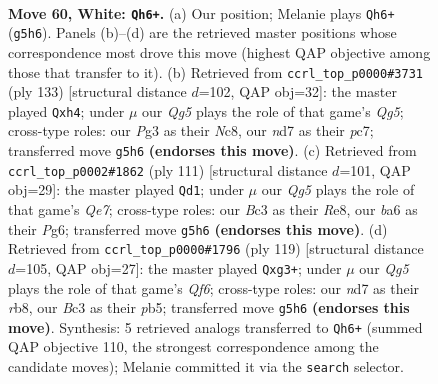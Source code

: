 \documentclass[11pt]{article}
\begin{document}
\clearpage

\begin{figure}[p]\centering
\begin{subfigure}{0.46\textwidth}\centering
\resizebox{\linewidth}{!}{%
\newchessgame
\chessboard[
  setfen={3q3k/3n1p2/b2P1n2/6Q1/2p4P/p1B2pP1/P7/1R4K1 w - - 0 60},
  showmover=false,
  pgfstyle=straightmove, color=movearrow, markmove={g5-h6}
]}
\caption{}
\end{subfigure}\hfill
\begin{subfigure}{0.46\textwidth}\centering
\resizebox{\linewidth}{!}{%
\newchessgame
\chessboard[
  setfen={2n2k2/p1P2p2/P7/4p2p/2Q1N1qP/3K4/8/8 b - - 5 67},
  showmover=false,
  pgfstyle=straightmove, color=movearrow, markmove={g4-h4}
]}
\caption{}
\end{subfigure}
\\[4pt]
\begin{subfigure}{0.46\textwidth}\centering
\resizebox{\linewidth}{!}{%
\newchessgame
\chessboard[
  setfen={4r1k1/5p2/6pp/1pPP4/6P1/1NQ1p2P/KR2q3/8 b - - 1 56},
  showmover=false,
  pgfstyle=straightmove, color=movearrow, markmove={e2-d1}
]}
\caption{}
\end{subfigure}\hfill
\begin{subfigure}{0.46\textwidth}\centering
\resizebox{\linewidth}{!}{%
\newchessgame
\chessboard[
  setfen={1R6/7k/1Q1p1p2/1P2n1pr/4P3/5qP1/5N2/6K1 b - - 1 60},
  showmover=false,
  pgfstyle=straightmove, color=movearrow, markmove={f3-g3}
]}
\caption{}
\end{subfigure}
\caption{\textbf{Move 60, White: \texttt{Qh6+}.} (a) Our position; Melanie plays \texttt{Qh6+} (\texttt{g5h6}). Panels (b)--(d) are the retrieved master positions whose correspondence most drove this move (highest QAP objective among those that transfer to it). (b) Retrieved from \texttt{ccrl\_top\_p0000\#3731} (ply 133) [structural distance $d$=102, QAP obj=32]: the master played \texttt{Qxh4}; under $\mu$ our \emph{Qg5} plays the role of that game's \emph{Qg5}; cross-type roles: our \emph{P}g3 as their \emph{N}c8, our \emph{n}d7 as their \emph{p}c7; transferred move \texttt{g5h6} \textbf{(endorses this move)}. (c) Retrieved from \texttt{ccrl\_top\_p0002\#1862} (ply 111) [structural distance $d$=101, QAP obj=29]: the master played \texttt{Qd1}; under $\mu$ our \emph{Qg5} plays the role of that game's \emph{Qe7}; cross-type roles: our \emph{B}c3 as their \emph{R}e8, our \emph{b}a6 as their \emph{P}g6; transferred move \texttt{g5h6} \textbf{(endorses this move)}. (d) Retrieved from \texttt{ccrl\_top\_p0000\#1796} (ply 119) [structural distance $d$=105, QAP obj=27]: the master played \texttt{Qxg3+}; under $\mu$ our \emph{Qg5} plays the role of that game's \emph{Qf6}; cross-type roles: our \emph{n}d7 as their \emph{r}b8, our \emph{B}c3 as their \emph{p}b5; transferred move \texttt{g5h6} \textbf{(endorses this move)}. Synthesis: 5 retrieved analogs transferred to \texttt{Qh6+} (summed QAP objective 110, the strongest correspondence among the candidate moves); Melanie committed it via the \texttt{search} selector.}
\label{fig:thought-m118}
\end{figure}
\end{document}
